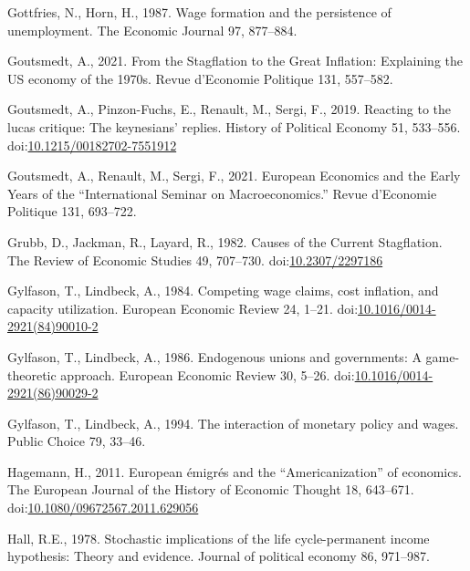 \documentclass[
]{article}
\newlength{\cslhangindent}
\newlength{\cslentryspacingunit} %
\newenvironment{CSLReferences}[2] %
 {%
  \setlength{\parindent}{0pt}
  \ifodd #1
  \let\oldpar\par
  \def\par{\hangindent=\cslhangindent\oldpar}
  \fi
  \setlength{\parskip}{#2\cslentryspacingunit}
 }%
 {}
\begin{document}
\begin{CSLReferences}{1}{0}
\leavevmode{}%
Gottfries, N., Horn, H., 1987. Wage formation and the persistence of
unemployment. The Economic Journal 97, 877--884.

\leavevmode{}%
Goutsmedt, A., 2021. From the {Stagflation} to the {Great Inflation}:
{Explaining} the {US} economy of the 1970s. Revue d'Economie Politique
131, 557--582.

\leavevmode{}%
Goutsmedt, A., Pinzon-Fuchs, E., Renault, M., Sergi, F., 2019. Reacting
to the lucas critique: {The} keynesians' replies. History of Political
Economy 51, 533--556.
doi:\href{https://doi.org/10.1215/00182702-7551912}{10.1215/00182702-7551912}

\leavevmode{}%
Goutsmedt, A., Renault, M., Sergi, F., 2021. European {Economics} and
the {Early Years} of the {``{International Seminar} on
{Macroeconomics}.''} Revue d'Economie Politique 131, 693--722.

\leavevmode{}%
Grubb, D., Jackman, R., Layard, R., 1982. Causes of the {Current
Stagflation}. The Review of Economic Studies 49, 707--730.
doi:\href{https://doi.org/10.2307/2297186}{10.2307/2297186}

\leavevmode{}%
Gylfason, T., Lindbeck, A., 1984. Competing wage claims, cost inflation,
and capacity utilization. European Economic Review 24, 1--21.
doi:\href{https://doi.org/10.1016/0014-2921(84)90010-2}{10.1016/0014-2921(84)90010-2}

\leavevmode{}%
Gylfason, T., Lindbeck, A., 1986. Endogenous unions and governments: {A}
game-theoretic approach. European Economic Review 30, 5--26.
doi:\href{https://doi.org/10.1016/0014-2921(86)90029-2}{10.1016/0014-2921(86)90029-2}

\leavevmode{}%
Gylfason, T., Lindbeck, A., 1994. The interaction of monetary policy and
wages. Public Choice 79, 33--46.

\leavevmode{}%
Hagemann, H., 2011. European émigrés and the {``{Americanization}''} of
economics. The European Journal of the History of Economic Thought 18,
643--671.
doi:\href{https://doi.org/10.1080/09672567.2011.629056}{10.1080/09672567.2011.629056}

\leavevmode{}%
Hall, R.E., 1978. Stochastic implications of the life cycle-permanent
income hypothesis: Theory and evidence. Journal of political economy 86,
971--987.


\end{CSLReferences}
\end{document}
